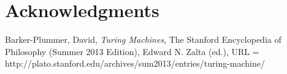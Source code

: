 \documentclass[final,leqno]{siamltex}
\begin{document}
\section*{Acknowledgments}
 
 
\begin{thebibliography}{10} 
 {\sc Barker-Plummer, David}, 
{\em Turing Machines}, The Stanford Encyclopedia of Philosophy (Summer 2013 Edition), Edward N. Zalta (ed.), URL = http://plato.stanford.edu/archives/sum2013/entries/turing-machine/
 
\end{thebibliography} 
\end{document}

